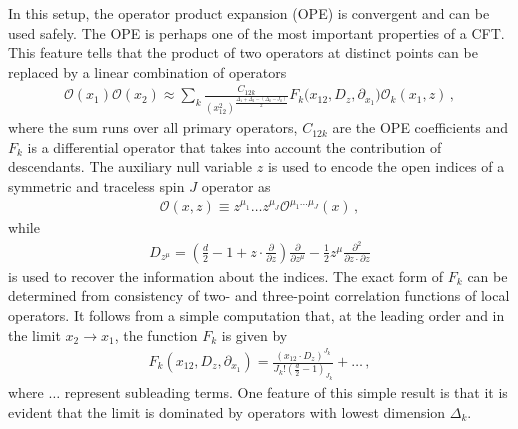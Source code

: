 In this setup, the operator product expansion (OPE) is convergent and can be used safely.
The OPE is perhaps one of the most important properties of a CFT.
This feature tells that the product of two operators at distinct points can be replaced by a linear combination of operators
\begin{align}
  \mathcal{O}(x_1)\mathcal{O}(x_2) \approx \sum_{k} \frac{C_{12k}}{(x_{12}^2)^{\frac{\Delta_1+\Delta_2-(\Delta_k-J_k)}{2}}}
  F_k \big(x_{12}, D_{z},\partial_{x_1}\big)\mathcal{O}_k(x_1,z)\,,
  \label{eq:OPEequation}
\end{align}
where the sum runs over all primary operators, $C_{12k}$ are the OPE coefficients and $F_{k}$ is a differential operator that takes into account the contribution of descendants.
The auxiliary null variable $z$ is used to encode the open indices of a symmetric and traceless spin $J$ operator as
\begin{align}
  \mathcal{O}(x,z) \equiv z^{\mu_1}\dots z^{\mu_J} \mathcal{O}^{\mu_1\dots \mu_J}(x)\,,
\end{align}
while
\begin{align}
  D_{z^{\mu}} =\left( \frac{d}{2}-1+z\cdot\frac{\partial}{\partial z} \right)\frac{\partial}{\partial z^\mu}-\frac{1}{2} z^ \mu \frac{\partial^2}{\partial z \cdot \partial z}
  \label{eq:TodorovOPE}
\end{align}
is used to recover the information about the indices.
The exact form of $F_k$ can be determined from consistency of two- and three-point correlation functions of local operators.
It follows from a simple computation that, at the leading order and in the limit $x_2\rightarrow x_1$, the function $F_k$ is given by
\begin{align}
  F_k (x_{12}, D_{z},\partial_{x_1}) = \frac{(x_{12}\cdot D_{z})^{J_k}}{J_k!\left(\frac{d}{2}-1\right)_{J_k}} +\dots\,,
  \label{eq:OPEEuclideanLEading}
\end{align}
where $\dots$ represent  subleading terms.
One feature of this simple result is that it is evident that the limit is dominated by operators with lowest dimension $ \Delta_k $.
